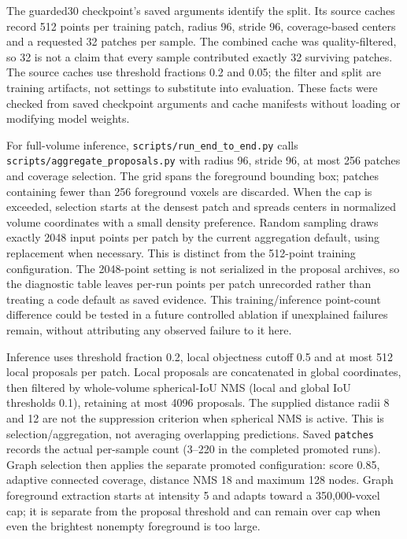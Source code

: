 \documentclass[11pt]{article}
\begin{document}
The guarded30 checkpoint's saved arguments identify the
{\small{}}
split. Its source caches record 512 points per training patch, radius 96,
stride 96, coverage-based centers and a requested 32 patches per sample.
The combined cache was quality-filtered, so 32 is not a claim that every sample
contributed exactly 32 surviving patches. The source caches use threshold
fractions 0.2 and 0.05; the filter and split are training artifacts, not settings
to substitute into evaluation. These facts were checked from saved checkpoint
arguments and cache manifests without loading or modifying model weights.

For full-volume inference, \texttt{scripts/run\_end\_to\_end.py} calls
\texttt{scripts/aggregate\_proposals.py} with radius 96, stride 96, at most
256 patches and coverage selection. The grid spans the foreground bounding
box; patches containing fewer than 256 foreground voxels are discarded. When
the cap is exceeded, selection starts at the densest patch and spreads centers
in normalized volume coordinates with a small density preference. Random
sampling draws exactly 2048 input points per patch by the current aggregation
default, using replacement when necessary. This is distinct from the
512-point training configuration. The 2048-point setting is not serialized in
the proposal archives, so the diagnostic table leaves per-run points per patch
unrecorded rather than treating a code default as saved evidence.
This training/inference point-count difference could be tested in a future
controlled ablation if unexplained failures remain, without attributing any
observed failure to it here.

Inference uses threshold fraction 0.2, local objectness cutoff 0.5 and at most
512 local proposals per patch. Local proposals are concatenated in global
coordinates, then filtered by whole-volume spherical-IoU NMS (local and global
IoU thresholds 0.1), retaining at most 4096 proposals. The supplied distance
radii 8 and 12 are not the suppression criterion when spherical NMS is active.
This is selection/aggregation, not averaging overlapping predictions. Saved
\texttt{patches} records the actual per-sample count (3--220 in the completed
promoted runs). Graph selection then
applies the separate promoted configuration: score 0.85, adaptive connected
coverage, distance NMS 18 and maximum 128 nodes. Graph foreground extraction
starts at intensity 5 and adapts toward a 350,000-voxel cap; it is separate from
the proposal threshold and can remain over cap when even the brightest
nonempty foreground is too large.
\end{document}
